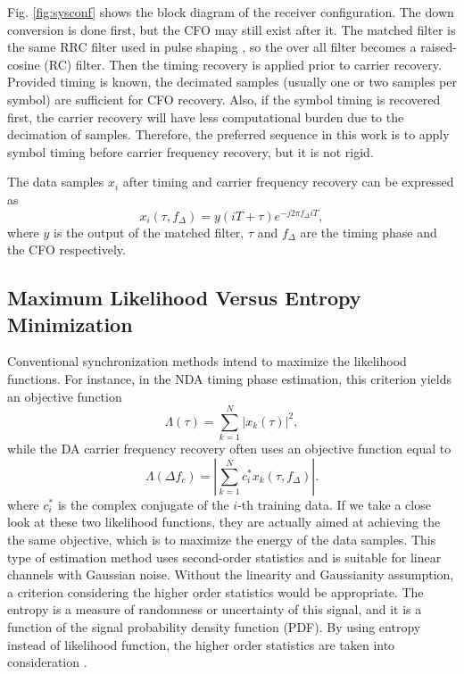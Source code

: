 \documentclass[journal,comsoc]{IEEEtran}
\begin{document}
Fig. \ref{fig:sysconf} shows the block diagram of the receiver configuration.
The down conversion is done first, but the CFO may still exist after it.
The matched filter is the same RRC filter used in pulse shaping , so the over all filter becomes a raised-cosine (RC) filter. 
Then the timing recovery is applied prior to carrier recovery.
Provided timing is known, the decimated samples (usually one or two samples per symbol) are sufficient for CFO recovery.
Also, if the symbol timing is recovered first, the carrier recovery will have less computational burden due to the decimation of samples.
Therefore, the preferred sequence in this work is to apply symbol timing before carrier frequency recovery, but it is not rigid.

The data samples \(x_i\) after timing and carrier frequency recovery can be expressed as
\begin{equation}
{x_i}( \tau ,{f_\Delta }) = y(iT +  \tau ){e^{ - j2\pi {f_\Delta }iT}},
\end{equation}
where \(y\) is the output of the matched filter, \(\tau\) and \(f_\Delta\) are the timing phase and the CFO respectively.


\subsection{Maximum Likelihood Versus Entropy Minimization}
Conventional synchronization methods intend to maximize the likelihood functions.
For instance, in the NDA timing phase estimation, this criterion yields an objective function
\begin{equation}
\Lambda(\tau) =\sum\limits_{k = 1}^N {{{\left| {{x_k}( \tau )} \right|}^2}}, 
\end{equation}
while the DA carrier frequency recovery often uses an objective function equal to
\begin{equation}
\Lambda ({\Delta f_c })=\left| \sum\limits_{k = 1}^N {{{{c_i^*{x_k}(\tau ,{f_\Delta })}}}} \right|. 
\end{equation}
where \(c_i^*\) is the complex conjugate of the \(i\)-th training data.
If we take a close look at these two likelihood functions, they are actually aimed at achieving the the same objective, which is to maximize the energy of the data samples.
This type of estimation method uses second-order statistics and is suitable for linear channels with Gaussian noise.
Without the linearity and Gaussianity assumption, a criterion considering the higher order statistics would be appropriate.
The entropy is a measure of randomness or uncertainty of this signal, and it is a function of the signal probability density function (PDF).
By using entropy instead of likelihood function, the higher order statistics are taken into consideration \cite{Santamaria2002}.
\end{document}
